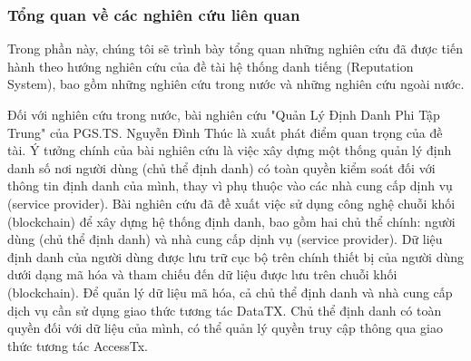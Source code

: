 \documentclass{article}[14pt]
\begin{document}
{        %
        
        \subsubsection{Tổng quan về các nghiên cứu liên quan}
            Trong phần này, chúng tôi sẽ trình bày tổng quan những nghiên cứu đã được tiến hành theo hướng nghiên cứu của đề tài hệ thống danh tiếng (Reputation System), bao gồm những nghiên cứu trong nước và những nghiên cứu ngoài nước. 
            \par
            Đối với nghiên cứu trong nước, bài nghiên cứu "Quản Lý Định Danh Phi Tập Trung" của PGS.TS. Nguyễn Đình Thúc \cite{quan-ly-dinh-danh-phi-tap-trung} là xuất phát điểm quan trọng của đề tài. Ý tưởng chính của bài nghiên cứu là việc xây dựng một thống quản lý định danh số nơi người dùng (chủ thể định danh) có toàn quyền kiểm soát đối với thông tin định danh của mình, thay vì phụ thuộc vào các nhà cung cấp dịnh vụ (service provider). Bài nghiên cứu đã đề xuất việc sử dụng công nghệ chuỗi khối (blockchain) để xây dựng hệ thống định danh, bao gồm hai chủ thể chính: người dùng (chủ thể định danh) và nhà cung cấp dịnh vụ (service provider). Dữ liệu định danh của người dùng được lưu trữ cục bộ trên chính thiết bị của người dùng dưới dạng mã hóa và tham chiếu đến dữ liệu được lưu trên chuỗi khối (blockchain). Để quản lý dữ liệu mã hóa, cả chủ thể định danh và nhà cung cấp dịch vụ cần sử dụng giao thức tương tác DataTX. Chủ thể định danh có toàn quyền đối với dữ liệu của mình, có thể quản lý quyền truy cập thông qua giao thức tương tác AccessTx. 
            \par
}
\end{document}

